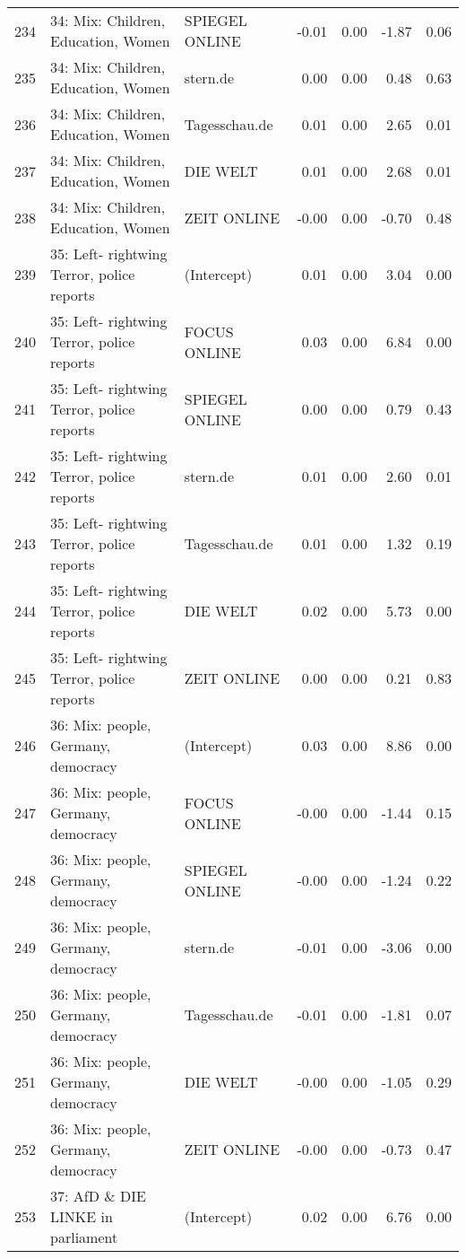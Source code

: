 \begin{table}[ht]
{\begin{tabular}{rllrrrr}
  234 & 34: Mix: Children, Education, Women & SPIEGEL ONLINE & -0.01 & 0.00 & -1.87 & 0.06 \\ 
  235 & 34: Mix: Children, Education, Women & stern.de & 0.00 & 0.00 & 0.48 & 0.63 \\ 
  236 & 34: Mix: Children, Education, Women & Tagesschau.de & 0.01 & 0.00 & 2.65 & 0.01 \\ 
  237 & 34: Mix: Children, Education, Women & DIE WELT & 0.01 & 0.00 & 2.68 & 0.01 \\ 
  238 & 34: Mix: Children, Education, Women & ZEIT ONLINE & -0.00 & 0.00 & -0.70 & 0.48 \\ 
  239 & 35: Left- rightwing Terror, police reports & (Intercept) & 0.01 & 0.00 & 3.04 & 0.00 \\ 
  240 & 35: Left- rightwing Terror, police reports & FOCUS ONLINE & 0.03 & 0.00 & 6.84 & 0.00 \\ 
  241 & 35: Left- rightwing Terror, police reports & SPIEGEL ONLINE & 0.00 & 0.00 & 0.79 & 0.43 \\ 
  242 & 35: Left- rightwing Terror, police reports & stern.de & 0.01 & 0.00 & 2.60 & 0.01 \\ 
  243 & 35: Left- rightwing Terror, police reports & Tagesschau.de & 0.01 & 0.00 & 1.32 & 0.19 \\ 
  244 & 35: Left- rightwing Terror, police reports & DIE WELT & 0.02 & 0.00 & 5.73 & 0.00 \\ 
  245 & 35: Left- rightwing Terror, police reports & ZEIT ONLINE & 0.00 & 0.00 & 0.21 & 0.83 \\ 
  246 & 36: Mix: people, Germany, democracy & (Intercept) & 0.03 & 0.00 & 8.86 & 0.00 \\ 
  247 & 36: Mix: people, Germany, democracy & FOCUS ONLINE & -0.00 & 0.00 & -1.44 & 0.15 \\ 
  248 & 36: Mix: people, Germany, democracy & SPIEGEL ONLINE & -0.00 & 0.00 & -1.24 & 0.22 \\ 
  249 & 36: Mix: people, Germany, democracy & stern.de & -0.01 & 0.00 & -3.06 & 0.00 \\ 
  250 & 36: Mix: people, Germany, democracy & Tagesschau.de & -0.01 & 0.00 & -1.81 & 0.07 \\ 
  251 & 36: Mix: people, Germany, democracy & DIE WELT & -0.00 & 0.00 & -1.05 & 0.29 \\ 
  252 & 36: Mix: people, Germany, democracy & ZEIT ONLINE & -0.00 & 0.00 & -0.73 & 0.47 \\ 
  253 & 37: AfD \& DIE LINKE in parliament & (Intercept) & 0.02 & 0.00 & 6.76 & 0.00 \\ 

\end{tabular}}
\end{table}
